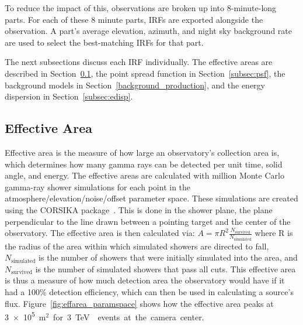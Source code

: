 To reduce the impact of this, observations are broken up into 8-minute-long parts.
For each of these 8 minute parts, IRFs are exported alongside the observation.
A part's average elevation, azimuth, and night sky background rate are used to select the best-matching IRFs for that part.

The next subsections discuss each IRF individually.
The effective areas are described in Section~\ref{subsec:effarea}, the point spread function in Section~\ref{subsec:psf}, the background models in Section~\ref{background_production}, and the energy dispersion in Section~\ref{subsec:edisp}.

\FloatBarrier
  
\subsection{Effective Area}\label{subsec:effarea}
Effective area is the measure of how large an observatory's collection area is, which determines how many gamma rays can be detected per unit time, solid angle, and energy.
The effective areas are calculated with  million Monte Carlo gamma-ray shower simulations for each point in the atmosphere/elevation/noise/offset parameter space.
These simulations are created using the CORSIKA package~\cite{corsika1998}.
This is done in the shower plane, the plane perpendicular to the line drawn between a pointing target and the center of the observatory.
The effective area is then calculated via:
$A=\pi R^2 \frac{N_{\text{survived}}}{N_{\text{simulated}}}$
where R is the radius of the area within which simulated showers are directed to fall, $N_{\text{simulated}}$ is the number of showers that were initially simulated into the area, and $N_{\text{survived}}$ is the number of simulated showers that pass all cuts.
This effective area is thus a measure of how much detection area the observatory would have if it had a 100\% detection efficiency, which can then be used in calculating a source's flux.
Figure~\ref{fig:effarea_paramspace} shows how the effective area peaks at \nicetilde{}\SI{3e5}{m${}^2$} for \SI{3}{\TeV{}} events at the camera center.

